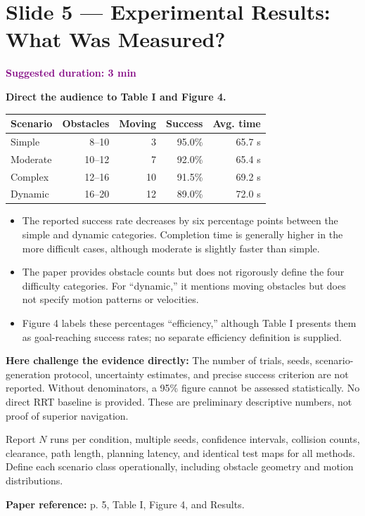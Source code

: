 \documentclass[11pt,a4paper]{article}
\newcommand{\slide}[3]{\clearpage\section*{Slide #1 --- #2}\textcolor{purple}{\textbf{Suggested duration: #3}}\par\medskip}
\newcommand{\source}[1]{\par\small\textcolor{deep}{\textbf{Paper reference:} #1}\normalsize}
\begin{document}
\slide{5}{Experimental Results: What Was Measured?}{3 min}
\textbf{Direct the audience to Table I and Figure 4.}
\begin{center}\small
\begin{tabular}{lrrrr}\toprule
Scenario & Obstacles & Moving & Success & Avg. time \\\midrule
Simple & 8--10 & 3 & 95.0\% & 65.7 s\\
Moderate & 10--12 & 7 & 92.0\% & 65.4 s\\
Complex & 12--16 & 10 & 91.5\% & 69.2 s\\
Dynamic & 16--20 & 12 & 89.0\% & 72.0 s\\\bottomrule
\end{tabular}
\end{center}
\begin{itemize}
\item The reported success rate decreases by six percentage points between the simple and dynamic categories. Completion time is generally higher in the more difficult cases, although moderate is slightly faster than simple.
\item The paper provides obstacle counts but does not rigorously define the four difficulty categories. For ``dynamic,'' it mentions moving obstacles but does not specify motion patterns or velocities.
\item Figure 4 labels these percentages ``efficiency,'' although Table I presents them as goal-reaching success rates; no separate efficiency definition is supplied.
\end{itemize}
\begin{critique}
\textbf{Here challenge the evidence directly:} The number of trials, seeds, scenario-generation protocol, uncertainty estimates, and precise success criterion are not reported. Without denominators, a 95\% figure cannot be assessed statistically. No direct RRT baseline is provided. These are preliminary descriptive numbers, not proof of superior navigation.
\end{critique}
\begin{repair}
Report $N$ runs per condition, multiple seeds, confidence intervals, collision counts, clearance, path length, planning latency, and identical test maps for all methods. Define each scenario class operationally, including obstacle geometry and motion distributions.
\end{repair}
\source{p. 5, Table I, Figure 4, and Results.}
\end{document}
